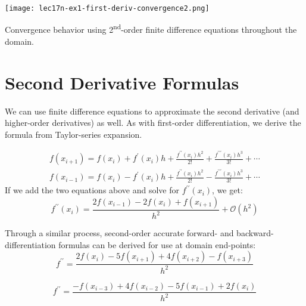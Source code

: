 \begin{marginfigure}[-3.0cm]
\texttt{[image: lec17n-ex1-first-deriv-convergence2.png]}
\caption{Convergence behavior using 2\textsuperscript{nd}-order finite difference equations throughout the domain.}
\label{fig:lec17n-ex1-first-deriv-convergence2}
\end{marginfigure}

\section{Second Derivative Formulas}

We can use finite difference equations to approximate the second derivative (and higher-order derivatives) as well.  As with first-order differentiation, we derive the formula from Taylor-series expansion.

\begin{align*}
f(x_{i+1})=f(x_i)+f^{\prime}(x_i)h+\frac{f^{\prime \prime}(x_i)h^2}{2!}+\frac{f^{\prime\prime\prime}(x_i)h^3}{3!}+ \cdots \\
f(x_{i-1})=f(x_i)-f^{\prime}(x_i)h+\frac{f^{\prime \prime}(x_i)h^2}{2!}-\frac{f^{\prime\prime\prime}(x_i)h^3}{3!}+ \cdots
\end{align*}
If we add the two equations above and solve for $f^{\prime \prime}(x_i)$, we get:
\begin{equation}
f^{\prime \prime}(x_i) = \frac{2f(x_{i-1})-2f(x_{i})+f(x_{i+1})}{h^2}+\mathcal{O}(h^2)
\label{eq:secondDeriv-centered}
\end{equation}

Through a similar process, second-order accurate forward- and backward-differentiation formulas can be derived for use at domain end-points:
\begin{equation}
f^{\prime \prime} = \frac{2f(x_i) - 5f(x_{i+1}) + 4f(x_{i+2}) - f(x_{i+3})}{h^2} 
\label{eq:secondDeriv-forward}
\end{equation}

\begin{equation}
f^{\prime \prime} = \frac{-f(x_{i-3})+4f(x_{i-2})-5f(x_{i-1})+2f(x_i)}{h^2} 
\label{eq:secondDeriv-backward}
\end{equation}


